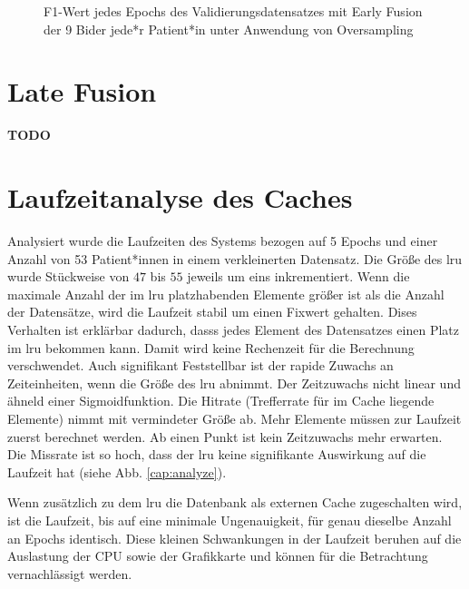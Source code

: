 \begin{figure}[b]\centering
\makebox[0pt]{}
\caption[F1-Wert jedes Epochs des Validierungsdatensatzes mit Early Fusion unter Anwendung von Oversampling]{F1-Wert jedes Epochs des Validierungsdatensatzes mit Early Fusion der 9 Bider jede*r Patient*in unter Anwendung von Oversampling}\label{cap:f1_ef_oversampling}
\end{figure}\label{fig:f1_ef_oversampling}

\clearpage
\section{Late Fusion}\label{latefusion}
\textbf{TODO}






















\clearpage
\section{Laufzeitanalyse des Caches}\label{analyze}
Analysiert wurde die Laufzeiten des Systems bezogen auf 5 Epochs und einer Anzahl von 53 Patient*innen in einem verkleinerten Datensatz. Die Größe des \ac{lru} wurde Stückweise von $47$ bis $55$ jeweils um eins inkrementiert. Wenn die maximale Anzahl der im \ac{lru} platzhabenden Elemente größer ist als die Anzahl der Datensätze, wird die Laufzeit stabil um einen Fixwert gehalten. Dises Verhalten ist erklärbar dadurch, dasss jedes Element des Datensatzes einen Platz im \ac{lru} bekommen kann. Damit wird keine Rechenzeit für die Berechnung verschwendet. Auch signifikant Feststellbar ist der rapide Zuwachs an Zeiteinheiten, wenn die Größe des \ac{lru} abnimmt. Der Zeitzuwachs nicht linear und ähneld einer Sigmoidfunktion. Die Hitrate (Trefferrate für im Cache liegende Elemente) nimmt mit vermindeter Größe ab. Mehr Elemente müssen zur Laufzeit zuerst berechnet werden. Ab einen Punkt ist kein Zeitzuwachs mehr erwarten. Die Missrate ist so hoch, dass der \ac{lru} keine signifikante Auswirkung auf die Laufzeit hat (siehe Abb. \ref{cap:analyze}).

Wenn zusätzlich zu dem \ac{lru} die Datenbank als externen Cache zugeschalten wird, ist die Laufzeit, bis auf eine minimale Ungenauigkeit, für genau dieselbe Anzahl an Epochs identisch. Diese kleinen Schwankungen in der Laufzeit beruhen auf die Auslastung der CPU sowie der Grafikkarte und können für die Betrachtung vernachlässigt werden.

